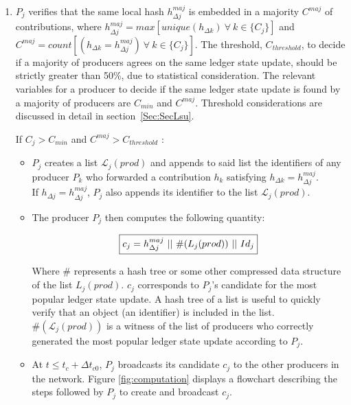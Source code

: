 \begin{enumerate}
\item $P_j$ verifies that the same local hash $h^{maj}_{\Delta j}$ is embedded in a majority $C^{maj}$ of contributions, where $h^{maj}_{\Delta j}= max[unique(h_{\Delta k})~\forall~k\in\{C_j\}]$ and $C^{maj} = count[(h_{\Delta k} = h^{maj}_{\Delta j})~\forall~k\in\{C_j\}]$. The threshold, $C_{threshold}$, to decide if a majority of producers agrees on the same ledger state update, should be strictly greater than 50\%, due to statistical consideration. The relevant variables for a producer to decide if the same ledger state update is found by a majority of producers are $C_{min}$ and $C^{maj}$. Threshold considerations are discussed in detail in section~\ref{Sec:SecLsu}. 

If $C_j > C_{min}$ and  $C^{maj}  > C_{threshold}$ :

\begin{itemize}
\item $P_j$ creates a list $\mathcal{L}_j(prod)$ and appends to said list the identifiers of any producer $P_k$ who forwarded a contribution $h_k$ satisfying $h_{\Delta k} = h^{maj}_{\Delta j}$.\\
If $h_{\Delta j}= h^{maj}_{\Delta j}$, $P_j$ also appends its identifier to the list $\mathcal{L}_j(prod)$.
\item The producer $P_j$ then computes the following quantity: 

\begin{equation}
\label{eq:cj}
\fbox{$c_j = h^{maj}_{\Delta j}~||~\#(L_j(prod))~||~Id_j$}
\end{equation}

Where \# represents a hash tree or some other compressed data structure of the list $L_j(prod)$. $c_j$ corresponds to $P_j$'s candidate for the most popular ledger state update. A hash tree of a list is useful to quickly verify that an object (an identifier) is included in the list. $\#(\mathcal{L}_j(prod))$ is a witness of the list of producers who correctly generated the most popular ledger state update according to $P_j$. 
\item At $t \leq t_c+\Delta t_{c0}$, $P_j$ broadcasts its candidate $c_j$ to the other producers in the network. Figure \ref{fig:computation} displays a flowchart describing the steps followed by $P_j$ to create and broadcast $c_j$.  
\end{itemize}


\end{enumerate}

